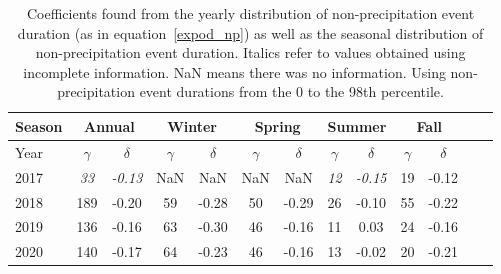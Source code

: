 \begin{table}[htb]
  \begin{center}
    \begin{tabular}{|l|*{11}{c|}r|}
      \hline
      Season    &       \multicolumn{2}{|c|}{Annual}          & \multicolumn{2}{|c|}{Winter}& \multicolumn{2}{|c|}{Spring}  & \multicolumn{2}{|c|}{Summer} &\multicolumn{2}{|c|}{Fall}  \\
      \hline
      Year      & $\gamma $ & $\delta$  & $\gamma $ & $\delta$ & $\gamma $ & $\delta$ & $\gamma $ & $\delta$ & $\gamma $ & $\delta$\\
      \hline
      2017      & \textit{33}  & \textit{-0.13}  & NaN & NaN & NaN & NaN & \textit{12}  & \textit{-0.15}  & 19  & -0.12  \\
      2018      & 189           & -0.20  & 59 & -0.28 & 50 & -0.29 & 26  & -0.10  & 55 & -0.22  \\
      2019      & 136           & -0.16  & 63 & -0.30 & 46 & -0.16 & 11 & 0.03 & 24 & -0.16   \\
      2020      & 140           & -0.17  & 64 & -0.23 & 46 & -0.16 & 13  & -0.02  & 20 & -0.21 \\
      \hline
    \end{tabular}
  \end{center}
  \caption[Year comparison of coefficients for non-precipitation
    events from 0 to 98th percentile] {\label{thirdtable_98}Coefficients found from the yearly
    distribution of non-precipitation event duration (as in
    equation~\ref{expod_np}) as well as the seasonal distribution of
    non-precipitation event duration. Italics refer to values obtained
    using incomplete information. NaN means there was no
    information. Using non-precipitation event durations from the 0 to the 98th percentile.}
\end{table}
